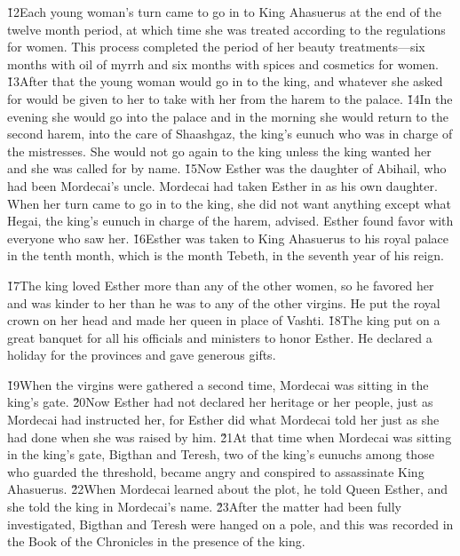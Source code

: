 \v{12}Each young woman's turn came to go in to King Ahasuerus at the end of the twelve month period, at which time she was treated according to the regulations for women. This process completed the period of her beauty treatments---six months with oil of myrrh and six months with spices and cosmetics for women. \v{13}After that the young woman would go in to the king, and whatever she asked for would be given to her to take with her from the harem to the palace. \v{14}In the evening she would go into the palace and in the morning she would return to the second harem, into the care of Shaashgaz, the king's eunuch who was in charge of the mistresses. She would not go again to the king unless the king wanted her and she was called for by name. \v{15}Now Esther was the daughter of Abihail, who had been Mordecai's uncle. Mordecai had taken Esther in as his own daughter. When her turn came to go in to the king, she did not want anything except what Hegai, the king's eunuch in charge of the harem, advised. Esther found favor with everyone who saw her. \v{16}Esther was taken to King Ahasuerus to his royal palace in the tenth month, which is the month Tebeth, in the seventh year of his reign.

\v{17}The king loved Esther more than any of the other women, so he favored her and was kinder to her than he was to any of the other virgins. He put the royal crown on her head and made her queen in place of Vashti. \v{18}The king put on a great banquet for all his officials and ministers to honor Esther. He declared a holiday for the provinces and gave generous gifts.

\v{19}When the virgins were gathered a second time, Mordecai was sitting in the king's gate. \v{20}Now Esther had not declared her heritage or her people, just as Mordecai had instructed her, for Esther did what Mordecai told her just as she had done when she was raised by him. \v{21}At that time when Mordecai was sitting in the king's gate, Bigthan and Teresh, two of the king's eunuchs among those who guarded the threshold, became angry and conspired to assassinate King Ahasuerus. \v{22}When Mordecai learned about the plot, he told Queen Esther, and she told the king in Mordecai's name. \v{23}After the matter had been fully investigated, Bigthan and Teresh were hanged on a pole, and this was recorded in the Book of the Chronicles in the presence of the king.

